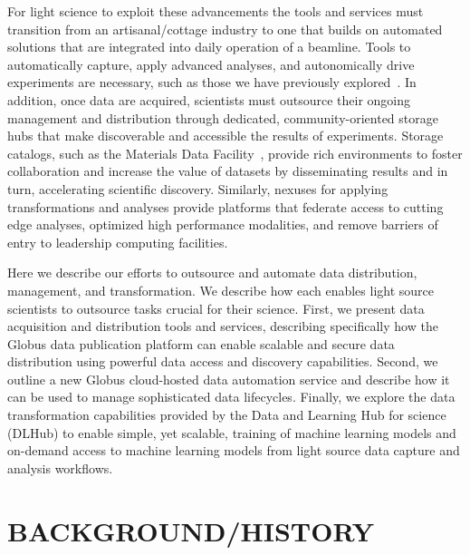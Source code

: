 \documentclass{aip-cp}
\begin{document}
For light science to exploit these advancements the tools and services must transition from an
artisanal/cottage industry to one that builds on 
automated solutions that are integrated into daily operation of a 
beamline. Tools to automatically capture, apply advanced analyses, and autonomically drive 
experiments are necessary, such as those we have previously explored~\cite{wozniak2015big}. In 
addition, once data are acquired, scientists must outsource their ongoing management and 
distribution through dedicated, community-oriented storage hubs that make discoverable and 
accessible the results of experiments. Storage catalogs, such as the Materials Data 
Facility~\cite{MDF2016}, provide rich environments to foster collaboration and increase the value 
of datasets by disseminating results and in turn, accelerating scientific discovery. Similarly, 
nexuses for applying transformations and analyses provide platforms that federate access to cutting 
edge analyses, optimized high performance modalities, and remove barriers of entry to leadership 
computing facilities.


Here we describe our efforts to outsource and automate
data distribution, management, and transformation. We
describe how each enables light source scientists to 
outsource tasks crucial for their science.
First, we present data acquisition and distribution tools and services, 
describing specifically how the Globus data publication platform can enable scalable and 
secure data distribution using powerful data access and discovery capabilities. 
Second, we outline a new Globus cloud-hosted data automation 
service and describe how it can be used to manage sophisticated data lifecycles. 
Finally, we explore the data transformation capabilities 
provided by the Data and Learning Hub for science (DLHub) 
to enable simple, yet scalable, training of machine learning models
and on-demand access to machine learning models from light source data capture
and analysis workflows.



\section{BACKGROUND/HISTORY}
\end{document}
